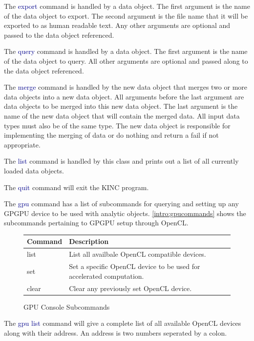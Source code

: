 \documentclass[10pt]{article}
\providecommand{\h}[1]{\textcolor{darkblue}{#1}}
\begin{document}
The \h{export} command is handled by a data object. The first argument is the 
name of the data object to export. The second argument is the file name that it 
will be exported to as human readable text. Any other arguments are optional 
and passed to the data object referenced.

The \h{query} command is handled by a data object. The first argument is the 
name of the data object to query. All other arguments are optional and passed 
along to the data object referenced.

The \h{merge} command is handled by the new data object that merges two or 
more data objects into a new data object. All arguments before the last 
argument are data objects to be merged into this new data object. 
The last argument is the name of the new data object that will contain the 
merged data. All input data types must also be of the same type. The new data 
object is responsible for implementing the merging of data or do nothing and 
return a fail if not appropriate.

The \h{list} command is handled by this class and prints out a list of all 
currently loaded data objects.

The \h{quit} command will exit the KINC program.

The \h{gpu} command has a list of subcommands for querying and setting up any 
GPGPU device to be used with analytic objects. \autoref{intro:gpucommands} shows 
the subcommands pertaining to GPGPU setup through OpenCL.

\begin{figure}[H]
\begin{mdframed}[style=vtable]
\begin{tabularx}{\textwidth}{|l|X|}
\hline
\textbf{Command} & \textbf{Description} \\
\hline
list & List all availbale OpenCL compatible devices. \\
\hline
set & Set a specific OpenCL device to be used for accelerated computation. \\
\hline
clear & Clear any previously set OpenCL device. \\
\hline
\end{tabularx}
\end{mdframed}
\caption{GPU Console Subcommands}
\label{intro:gpucommands}
\end{figure}

The \h{gpu list} command will give a complete list of all available OpenCL 
devices along with their address. An address is two numbers seperated by a 
colon.
\end{document}
